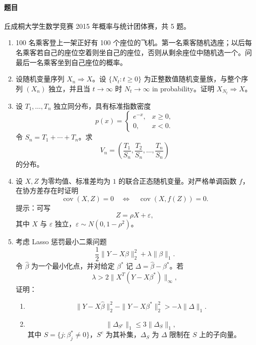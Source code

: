 \documentclass[UTF8,12pt]{ctexart}
\begin{document}
\paragraph{题目}
丘成桐大学生数学竞赛 2015 年概率与统计团体赛，共 5 题。
\begin{enumerate}[label=\textbf{\arabic*.},leftmargin=2.2em]
\item 100 名乘客登上一架正好有 100 个座位的飞机。第一名乘客随机选座；以后每名乘客若自己的座位空着则坐自己的座位，否则从剩余座位中随机选一个。问最后一名乘客坐到自己座位的概率。

\item 设随机变量序列 \(X_n\Rightarrow X\)。设 \(\{N_t:t\ge0\}\) 为正整数值随机变量族，与整个序列 \((X_n)\) 独立，并且当 \(t\to\infty\) 时 \(N_t\to\infty\) in probability。证明 \(X_{N_t}\Rightarrow X\)。

\item 设 \(T_1,\ldots,T_n\) 独立同分布，具有标准指数密度
\[
p(x)=
\begin{cases}
e^{-x},&x\ge0,\\
0,&x<0.
\end{cases}
\]
令 \(S_n=T_1+\cdots+T_n\)。求
\[
V_n=\left(\frac{T_1}{S_n},\frac{T_2}{S_n},\ldots,\frac{T_n}{S_n}\right)
\]
的分布。

\item 设 \(X,Z\) 为零均值、标准差均为 \(1\) 的联合正态随机变量。对严格单调函数 \(f\)，在协方差存在时证明
\[
\operatorname{cov}(X,Z)=0
\quad\Longleftrightarrow\quad
\operatorname{cov}(X,f(Z))=0.
\]
提示：可写
\[
Z=\rho X+\varepsilon,
\]
其中 \(X\) 与 \(\varepsilon\) 独立，\(\varepsilon\sim N(0,1-\rho^2)\)。

\item 考虑 Lasso 惩罚最小二乘问题
\[
\frac12\|Y-X\beta\|_2^2+\lambda\|\beta\|_1.
\]
令 \(\widehat\beta\) 为一个最小化点，并对给定 \(\beta^\ast\) 记 \(\Delta=\widehat\beta-\beta^\ast\)。若
\[
\lambda>2\|X^T(Y-X\beta^\ast)\|_\infty,
\]
证明：
\begin{enumerate}[label=\textbf{(\arabic*)},leftmargin=2.4em]
\item
\[
\|Y-X\widehat\beta\|_2^2-\|Y-X\beta^\ast\|_2^2>-\lambda\|\Delta\|_1.
\]
\item
\[
\|\Delta_{S^c}\|_1\le3\|\Delta_S\|_1,
\]
其中 \(S=\{j:\beta_j^\ast\ne0\}\)，\(S^c\) 为其补集，\(\Delta_S\) 为 \(\Delta\) 限制在 \(S\) 上的子向量。
\end{enumerate}
\end{enumerate}
\end{document}
